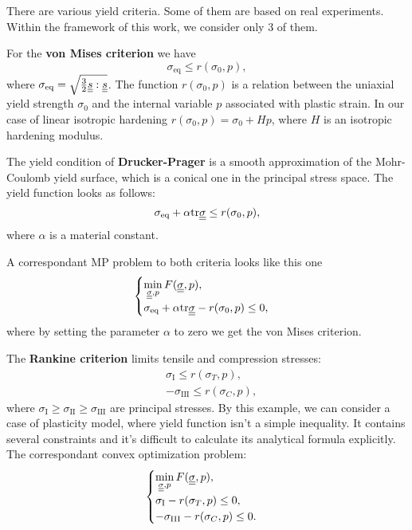 \documentclass[12pt]{article}
\begin{document}
There are various yield criteria. Some of them are based on real experiments. Within the framework of this work, we consider only 3 of them. 

For the \textbf{von Mises criterion} we have
\begin{equation*}
    \sigma_\text{eq} \leq r(\sigma_0, p),
\end{equation*}
where $\sigma_\text{eq} = \sqrt{\frac{3}{2}\underline{\underline{s}} : \underline{\underline{s}}}$. The function $r(\sigma_0, p)$ is a relation between the uniaxial yield strength $\sigma_0$ and the internal variable $p$ associated with plastic strain. In our case of linear isotropic hardening $r(\sigma_0, p) = \sigma_0 + Hp$, where $H$ is an isotropic hardening modulus.

The yield condition of \textbf{Drucker-Prager} is a smooth approximation of the Mohr-Coulomb yield surface, which is a conical one in the principal stress space. The yield function looks as follows:
\begin{equation*}
    \sigma_\text{eq} + \alpha\mathrm{tr}\underline{\underline{\sigma}} \leq r(\sigma_0, p),
\end{equation*}
where $\alpha$ is a material constant.

A correspondant MP problem to both criteria looks like this one
\begin{equation*}
    \begin{cases}
        \min\limits_{\underline{\underline{\sigma}}, p} F(\underline{\underline{\sigma}}, p), \\
        \sigma_\text{eq} + \alpha\mathrm{tr}\underline{\underline{\sigma}} - r(\sigma_0, p) \leq 0,
    \end{cases}
\end{equation*}
where by setting the parameter $\alpha$ to zero we get the von Mises criterion. 

The \textbf{Rankine criterion} limits tensile and compression stresses:
\begin{align*}
    & \sigma_\text{I} \leq r(\sigma_T, p), \\
    & -\sigma_\text{III} \leq r(\sigma_C, p),
\end{align*}
where $\sigma_\text{I} \geq \sigma_\text{II} \geq \sigma_\text{III}$ are principal stresses. By this example, we can consider a case of plasticity model, where yield function isn't a simple inequality. It contains several constraints and it's difficult to calculate its analytical formula explicitly. The correspondant convex optimization problem:
\begin{equation*}
    \begin{cases}
        \min\limits_{\underline{\underline{\sigma}}, p} F(\underline{\underline{\sigma}}, p), \\
        \sigma_\text{I} - r(\sigma_T, p) \leq 0, \\
        -\sigma_\text{III} - r(\sigma_C, p) \leq 0.    
    \end{cases}
\end{equation*}
\end{document}
